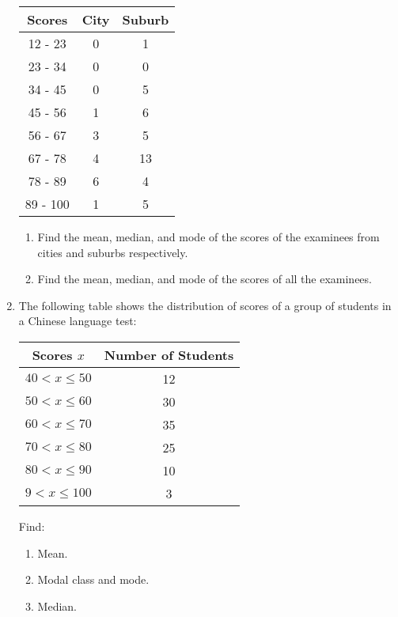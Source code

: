 \documentclass{report}
\begin{document}
\begin{multicols}{2}
\begin{enumerate}
\begin{center}
\begin{tabular}{|c|c|c|}
              \hline
              Scores   & City & Suburb \\ \hline
              12 - 23  & 0    & 1      \\
              23 - 34  & 0    & 0      \\
              34 - 45  & 0    & 5      \\
              45 - 56  & 1    & 6      \\
              56 - 67  & 3    & 5      \\
              67 - 78  & 4    & 13     \\
              78 - 89  & 6    & 4      \\
              89 - 100 & 1    & 5      \\
              \hline
            \end{tabular}
          \end{center}
          \begin{enumerate}
            \item Find the mean, median, and mode of the scores of the examinees from cities and
                  suburbs respectively.
            \item Find the mean, median, and mode of the scores of all the examinees.
          \end{enumerate}
    \item The following table shows the distribution of scores of a group of students in
          a Chinese language test:
          \begin{center}
            \begin{tabular}{|c|c|}
              \hline
              Scores $x$       & Number of Students \\ \hline
              $40 < x \leq 50$ & 12                 \\
              $50 < x \leq 60$ & 30                 \\
              $60 < x \leq 70$ & 35                 \\
              $70 < x \leq 80$ & 25                 \\
              $80 < x \leq 90$ & 10                 \\
              $9 < x \leq 100$ & 3                  \\
              \hline
            \end{tabular}
          \end{center}
          Find:
          \begin{enumerate}
            \item Mean.
            \item Modal class and mode.
            \item Median.
          \end{enumerate}
  \end{enumerate}


\end{multicols}
\end{document}
